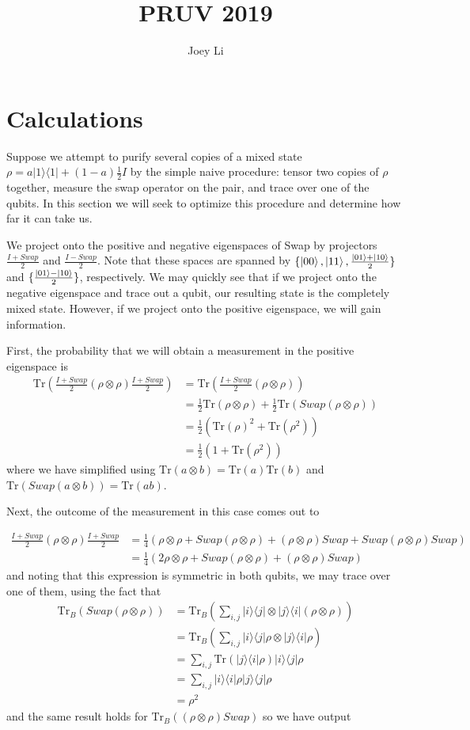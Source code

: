\documentclass[a4paper]{article}
\title{PRUV 2019}
\author{Joey Li}
\newcommand\0{\mathbf{0}}
\def\Tr{\textrm{Tr}}
\newcommand{\ketbra}[2]{|{#1}\>\!\<#2|}
\newcommand\<{\langle}
\renewcommand\>{\rangle}
\begin{document}
\maketitle

\section{Calculations}

Suppose we attempt to purify several copies of a mixed state $\rho = a\ketbra{1}{1} + (1-a)\frac{1}{2}I$ by the simple naive procedure: tensor two copies of $\rho$ together, measure the swap operator on the pair, and trace over one of the qubits. In this section we will seek to optimize this procedure and determine how far it can take us.

We project onto the positive and negative eigenspaces of Swap by projectors $\frac{I+Swap}{2}$ and $\frac{I-Swap}{2}$. Note that these spaces are spanned by $\{\ket{00}, \ket{11}, \frac{\ket{01}+\ket{10}}{2}\}$ and $\{\frac{\ket{01}-\ket{10}}{2}\}$, respectively. We may quickly see that if we project onto the negative eigenspace and trace out a qubit, our resulting state is the completely mixed state. However, if we project onto the positive eigenspace, we will gain information.

First, the probability that we will obtain a measurement in the positive eigenspace is 
\begin{align*}
    \Tr(\frac{I+Swap}{2} (\rho\otimes\rho)\frac{I+Swap}{2}) &= \Tr(\frac{I+Swap}{2} (\rho\otimes\rho)) \\
    &= \frac{1}{2} \Tr(\rho\otimes\rho) + \frac{1}{2}\Tr(Swap(\rho\otimes\rho)) \\
    &= \frac{1}{2}(\Tr(\rho)^2 + \Tr(\rho^2)) \\
    &= \frac{1}{2}(1+\Tr(\rho^2))
\end{align*}
where we have simplified using $\Tr(a\otimes b) = \Tr(a)\Tr(b)$ and $\Tr(Swap(a\otimes b)) = \Tr(ab)$.

Next, the outcome of the measurement in this case comes out to 

\begin{align*}
    \frac{I+Swap}{2} (\rho\otimes\rho)\frac{I+Swap}{2} &= \frac{1}{4}(\rho\otimes\rho + Swap(\rho\otimes\rho) + (\rho\otimes\rho)Swap + Swap(\rho\otimes\rho)Swap) \\
    &= \frac{1}{4}(2\rho\otimes\rho + Swap(\rho\otimes\rho) + (\rho\otimes\rho)Swap)
\end{align*}
and noting that this expression is symmetric in both qubits, we may trace over one of them, using the fact that 
\begin{align*}
    \Tr_B(Swap(\rho\otimes\rho)) &= \Tr_B(\sum_{i,j} \ketbra{i}{j}\otimes \ketbra{j}{i} (\rho\otimes\rho)) \\
    &= \Tr_B(\sum_{i,j} \ketbra{i}{j}\rho \otimes \ketbra{j}{i}\rho) \\
    &= \sum_{i,j} \Tr(\ketbra{j}{i}\rho) \ketbra{i}{j}\rho \\
    &= \sum_{i,j}\ketbra{i}{i}\rho\ketbra{j}{j}\rho \\
    &= \rho^2
\end{align*}
and the same result holds for $\Tr_B((\rho\otimes\rho) Swap)$ so we have output
\end{document}
